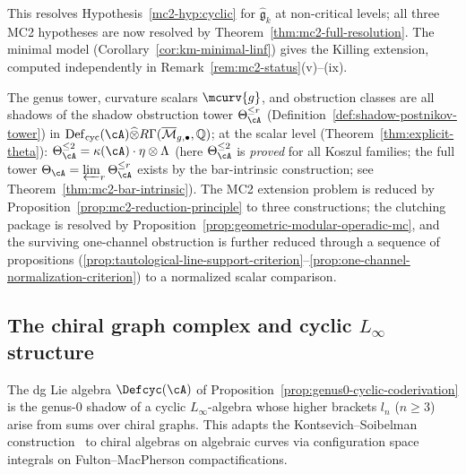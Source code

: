 \begin{remark}
\label{rem:mc2-1-km-scope}
This resolves Hypothesis~\ref{mc2-hyp:cyclic} for
$\widehat{\mathfrak{g}}_k$ at non-critical levels; all three MC2
hypotheses are now resolved by
Theorem~\ref{thm:mc2-full-resolution}. The minimal model
(Corollary~\ref{cor:km-minimal-linf}) gives the Killing extension,
computed independently in Remark~\ref{rem:mc2-status}(v)--(ix).
\end{remark}

\begin{remark}\label{rem:def-cyc-role}
The genus tower, curvature scalars $\mcurv{g}$, and obstruction
classes are all shadows of the shadow obstruction tower
$\Theta_\cA^{\leq r}$
(Definition~\ref{def:shadow-postnikov-tower})
in $\operatorname{Def}_{\mathrm{cyc}}(\cA) \widehat{\otimes}
R\Gamma(\overline{\mathcal{M}}_{g,\bullet}, \mathbb{Q})$;
at the scalar level (Theorem~\ref{thm:explicit-theta}):
$\Theta_\cA^{\leq 2} = \kappa(\cA) \cdot \eta \otimes \Lambda$
(here $\Theta_\cA^{\leq 2}$ is \emph{proved} for all Koszul families;
the full tower $\Theta_\cA = \varprojlim_r \Theta_\cA^{\leq r}$
exists by the bar-intrinsic construction;
see Theorem~\ref{thm:mc2-bar-intrinsic}).
The MC2 extension problem is reduced by
Proposition~\ref{prop:mc2-reduction-principle} to three constructions;
the clutching package is resolved by
Proposition~\ref{prop:geometric-modular-operadic-mc}, and the
surviving one-channel obstruction is further reduced through a
sequence of propositions
(\ref{prop:tautological-line-support-criterion}--\ref{prop:one-channel-normalization-criterion})
to a normalized scalar comparison.
\end{remark}

\subsection{The chiral graph complex and cyclic
\texorpdfstring{$L_\infty$}{L-infinity} structure}
\label{subsec:chiral-graph-complex}

The dg Lie algebra $\Defcyc(\cA)$ of
Proposition~\ref{prop:genus0-cyclic-coderivation} is the genus-$0$ shadow
of a cyclic $L_\infty$-algebra whose higher
brackets $l_n$ ($n \geq 3$) arise from sums over chiral
graphs. This adapts the Kontsevich--Soibelman
construction~\cite{KontsevichSoibelman} to chiral algebras on algebraic
curves via configuration space integrals on
Fulton--MacPherson compactifications.

